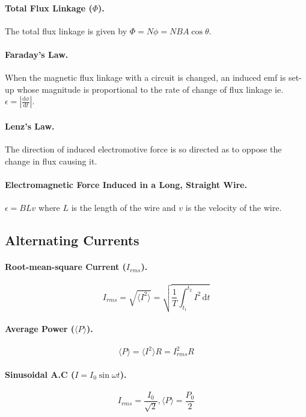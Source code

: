 \documentclass{article}
\begin{document}
\paragraph{Total Flux Linkage ($\Phi$).} The total flux linkage is given by
$\Phi = N\phi = NBA\cos\theta$.

\paragraph{Faraday's Law.} When the magnetic flux linkage with a circuit is
changed, an induced emf is set-up whose magnitude is proportional to the rate of
change of flux linkage ie. $\epsilon =
\left|\frac{\mathrm{d}\phi}{\mathrm{d}t}\right|$.

\paragraph{Lenz's Law.} The direction of induced electromotive force is so
directed as to oppose the change in flux causing it.

\paragraph{Electromagnetic Force Induced in a Long, Straight Wire.} $\epsilon =
BLv$ where $L$ is the length of the wire and $v$ is the velocity of the wire.

\subsection{Alternating Currents}

\paragraph{Root-mean-square Current ($I_{rms}$).} \begin{equation} I_{rms} =
\sqrt{\langle I^2 \rangle} = \sqrt{\frac{1}{T} \int^{t_2}_{t_1} \! I^2 \,
\mathrm{d}t} \end{equation}

\paragraph{Average Power ($\langle P \rangle$).} \begin{equation} \langle P
\rangle = \langle I^2 \rangle R = I^2_{rms}R \end{equation}

\paragraph{Sinusoidal A.C ($I = I_0\sin{\omega t}$).} \begin{equation} I_{rms} =
\frac{I_0}{\sqrt{2}}, \langle P \rangle = \frac{P_0}{2} \end{equation}
\end{document}
